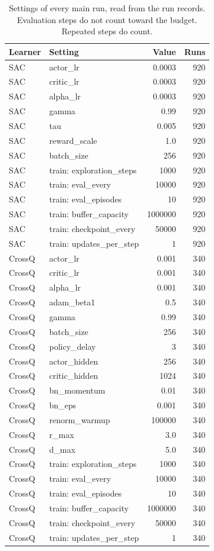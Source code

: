 \begin{table}[t]
\centering
\small
\begin{tabular}{llrr}
\toprule
Learner & Setting & Value & Runs \\
\midrule
SAC & actor\_lr & 0.0003 & 920 \\
SAC & critic\_lr & 0.0003 & 920 \\
SAC & alpha\_lr & 0.0003 & 920 \\
SAC & gamma & 0.99 & 920 \\
SAC & tau & 0.005 & 920 \\
SAC & reward\_scale & 1.0 & 920 \\
SAC & batch\_size & 256 & 920 \\
SAC & train: exploration\_steps & 1000 & 920 \\
SAC & train: eval\_every & 10000 & 920 \\
SAC & train: eval\_episodes & 10 & 920 \\
SAC & train: buffer\_capacity & 1000000 & 920 \\
SAC & train: checkpoint\_every & 50000 & 920 \\
SAC & train: updates\_per\_step & 1 & 920 \\
CrossQ & actor\_lr & 0.001 & 340 \\
CrossQ & critic\_lr & 0.001 & 340 \\
CrossQ & alpha\_lr & 0.001 & 340 \\
CrossQ & adam\_beta1 & 0.5 & 340 \\
CrossQ & gamma & 0.99 & 340 \\
CrossQ & batch\_size & 256 & 340 \\
CrossQ & policy\_delay & 3 & 340 \\
CrossQ & actor\_hidden & 256 & 340 \\
CrossQ & critic\_hidden & 1024 & 340 \\
CrossQ & bn\_momentum & 0.01 & 340 \\
CrossQ & bn\_eps & 0.001 & 340 \\
CrossQ & renorm\_warmup & 100000 & 340 \\
CrossQ & r\_max & 3.0 & 340 \\
CrossQ & d\_max & 5.0 & 340 \\
CrossQ & train: exploration\_steps & 1000 & 340 \\
CrossQ & train: eval\_every & 10000 & 340 \\
CrossQ & train: eval\_episodes & 10 & 340 \\
CrossQ & train: buffer\_capacity & 1000000 & 340 \\
CrossQ & train: checkpoint\_every & 50000 & 340 \\
CrossQ & train: updates\_per\_step & 1 & 340 \\
\bottomrule
\end{tabular}
\caption{Settings of every main run, read from the run records. Evaluation steps do not count toward the budget. Repeated steps do count.}
\label{tab:hyperparameters}
\end{table}
